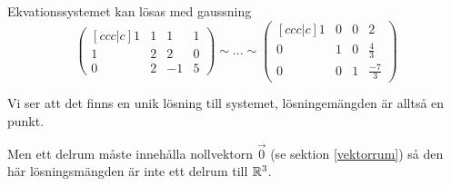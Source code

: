 \documentclass[../../main.tex]{subfiles}
\begin{document}
\begin{solution}{3}

Ekvationssystemet kan lösas med gaussning
$$
\begin{pmatrix}[ccc|c]
1&1&1&1\\
1&2&2&0\\
0&2&-1&5
\end{pmatrix}
\sim ... \sim 
\begin{pmatrix}[ccc|c]
1&0&0&2\\
0&1&0&\frac{4}{3}\\
0&0&1&\frac{-7}{3}
\end{pmatrix}
$$

Vi ser att det finns en unik lösning till systemet, lösningemängden är alltså en punkt.

Men ett delrum måste innehålla nollvektorn $\Vec{0}$ (se sektion \ref{vektorrum}) så den här lösningsmängden är inte ett delrum till $\mathbb{R}^{3}$.
\end{solution}
\end{document}
